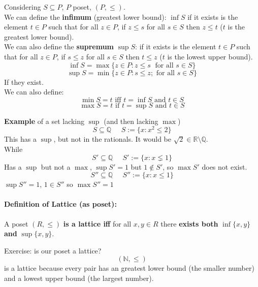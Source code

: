 \documentclass[11pt]{article}
\begin{document}
	Considering $S \subseteq P$, $P$ poset, $(P, \leq)$. \\
	
	We can define the \textbf{infimum} (greatest lower bound): $\inf S$ if it exists is the element $t \in P$ such that for all $z \in P$, if $z \leq s$ for all $s \in S$ then $z \leq t$ ($t$ is the greatest lower bound).\\
	
	We can also define the \textbf{supremum} $\sup S$: if it exists is the element $t \in P$ such that for all $z \in P$, if $s \leq z$ for all $s \in S$ then $t \leq z$ ($t$ is the lowest upper bound).\\
	
	$$ \inf S = \max \{z \in P: z \leq s \;\text{ for all } s \in S\}$$
	$$ \sup S = \min \{z \in P : s \leq z ; \text{ for all } s \in S\}$$
	If they exist.\\
	
	We can also define:
	$$ \min S = t \text{ iff } t = \inf S \text{ and } t \in S$$
	$$ \max S = t \text{ if } t = \sup S \text{ and } t \in S$$
	
	\newpage
	
	\textbf{Example} of a set lacking $\sup$ (and then lacking $\max$)
	$$ S \subseteq \mathbb{Q} \;\;\;\;\; S := \{x : x^2 \leq 2\}$$
	This has a $\sup$, but not in the rationals. It would be $\sqrt{2} \in \mathbb{R} \setminus \mathbb{Q}$.\\
	
	While
	$$ S' \subseteq \mathbb{Q} \;\;\;\;\; S' := \{x : x \lneq 1\}$$
	Has a $\sup$ but not a $\max$, $\sup S' = 1$ but $1 \notin S'$, so $\max S'$ does not exist.\\
	
	$$ S'' \subseteq \mathbb{Q} \;\;\;\;\; S'' := \{x : x \leq 1\}$$
	$\sup S'' = 1$, $1 \in S''$ so $\max S'' = 1$
	
	\paragraph{Definition of Lattice (as poset):} A poset $(R, \leq)$ \textbf{is a lattice iff} for all $x,y \in R$ there \textbf{exists both} $\inf \{x,y\}$ \textbf{and} $\sup\{x,y\}$.\\
	
	\vfill
	
	Exercise: is our poset a lattice?
	$$ (\mathbb{N}, \leq) $$
	is a lattice because every pair has an greatest lower bound (the smaller number) and a lowest upper bound (the largest number).
	
\end{document}
